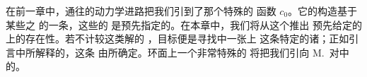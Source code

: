 
在前一章中，通往\trSymplecticInvariant{}的动力学进路把我们引到了那个特殊的%
\trCapacity{}函数 $c_{0}$。它的构造基于某些\trHamiltonianSystem{}之%
\trPeriodicSolution{}的一条\trVariationalPrinciple，这些\trPeriodicSolution{}的%
\trPeriodic{}是预先指定的。在本章中，我们将从这个\trSymplecticInvariant{}推出%
预先给定的\trEnergySurface{}上\trPeriodicSolution{}的存在性。若不计较这类解的%
\trParametrization，目标便是寻找\trSymplecticManifold{}中一张\trHypersurface{}上%
这条特定\trLineBundle{}的诸\trClosedCharacteristic；正如引言中所解释的，这条%
\trLineBundle{}由\trSymplecticStructure{}所确定。环面上一个非常特殊的%
\trSymplecticStructure{}将把我们引向 M.~\trHerman{}对\trSmoothCategory{}中%
\trClosingLemma{}的\trCounterexample。
